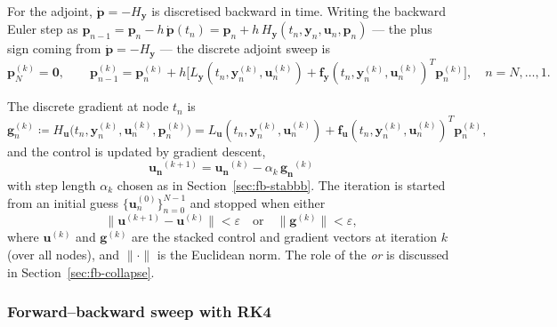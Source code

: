 \documentclass[a4paper, 10pt]{article}
\begin{document}
For the adjoint, $\dot{\bm{p}} = -H_{\bm{y}}$ is discretised backward in
time. Writing the backward Euler step as
$\bm{p}_{n-1} = \bm{p}_n - h\,\dot{\bm{p}}(t_n) = \bm{p}_n + h\,H_{\bm{y}}(t_n,\bm{y}_n,\bm{u}_n,\bm{p}_n)$
--- the plus sign coming from $\dot{\bm{p}} = -H_{\bm{y}}$ --- the discrete
adjoint sweep is
\begin{equation}
    \bm{p}_N^{(k)} = \bm{0}, \qquad
    \bm{p}_{n-1}^{(k)} = \bm{p}_n^{(k)}
        + h\bigl[L_{\bm{y}}(t_n,\bm{y}_n^{(k)},\bm{u}_n^{(k)})
        + \bm{f}_{\bm{y}}(t_n,\bm{y}_n^{(k)},\bm{u}_n^{(k)})^{T}\bm{p}_n^{(k)}\bigr],
    \quad n = N,\dots,1.
    \label{eq:fb-eul-adjoint}
\end{equation}

The discrete gradient at node $t_n$ is
\begin{equation}
    \bm{g}_n^{(k)} \coloneqq H_{\bm{u}}\bigl(t_n,\bm{y}_n^{(k)},\bm{u}_n^{(k)},\bm{p}_n^{(k)}\bigr)
    = L_{\bm{u}}(t_n,\bm{y}_n^{(k)},\bm{u}_n^{(k)})
        + \bm{f}_{\bm{u}}(t_n,\bm{y}_n^{(k)},\bm{u}_n^{(k)})^{T}\bm{p}_n^{(k)},
    \label{eq:fb-grad}
\end{equation}
and the control is updated by gradient descent,
\begin{equation}
    \bm{u_n}^{(k+1)} = \bm{u_n}^{(k)} - \alpha_k\,\bm{g_n}^{(k)}
    \label{eq:fb-ctrl-update}
\end{equation}
with step length $\alpha_k$ chosen as in Section~\ref{sec:fb-stabbb}. The
iteration is started from an initial guess
$\{\bm{u}_n^{(0)}\}_{n=0}^{N-1}$ and stopped when either
\begin{equation}
    \bigl\|\bm{u}^{(k+1)} - \bm{u}^{(k)}\bigr\| < \varepsilon
    \quad \text{or} \quad
    \bigl\|\bm{g}^{(k)}\bigr\| < \varepsilon,
    \label{eq:fb-stop}
\end{equation}
where $\bm{u}^{(k)}$ and $\bm{g}^{(k)}$ are the stacked control and
gradient vectors at iteration $k$ (over all nodes), and $\|\cdot\|$ is
the Euclidean norm.
The role of the \emph{or} is discussed in Section~\ref{sec:fb-collapse}.

\subsubsection{Forward--backward sweep with RK4}
\label{sec:fb-rk4}
\end{document}
